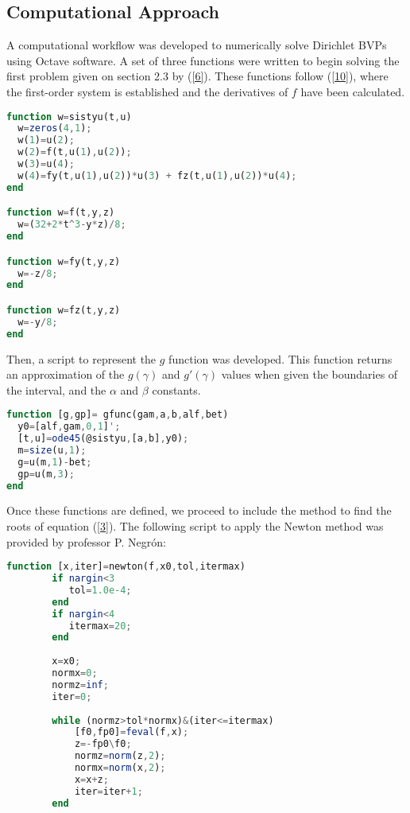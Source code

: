 \documentclass{article}
\begin{document}
\subsection{Computational Approach}

A computational workflow was developed to numerically solve Dirichlet BVPs using Octave software. A set of three functions were written to begin solving the first problem given on section 2.3 by (\ref{6}). These functions follow (\ref{10}), where the first-order system is established and the derivatives of $f$ have been calculated.  

\begin{lstlisting}[language=Octave]
function w=sistyu(t,u)
  w=zeros(4,1);
  w(1)=u(2);
  w(2)=f(t,u(1),u(2));
  w(3)=u(4);
  w(4)=fy(t,u(1),u(2))*u(3) + fz(t,u(1),u(2))*u(4);
end 

function w=f(t,y,z)
  w=(32+2*t^3-y*z)/8;
end

function w=fy(t,y,z)
  w=-z/8;
end

function w=fz(t,y,z)
  w=-y/8;
end
\end{lstlisting}

Then, a script to represent the $g$ function was developed. This function returns an approximation of the $g(\gamma)$ and $g'(\gamma)$ values when given the boundaries of the interval, and the $\alpha$ and $\beta$ constants. 

\begin{lstlisting}[language=Octave]
function [g,gp]= gfunc(gam,a,b,alf,bet)
  y0=[alf,gam,0,1]';
  [t,u]=ode45(@sistyu,[a,b],y0);
  m=size(u,1);
  g=u(m,1)-bet;
  gp=u(m,3);
end
\end{lstlisting}

\newpage 

Once these functions are defined, we proceed to include the method to find the roots of equation (\ref{3}). The following script to apply the Newton method was provided by professor P. Negr\'{o}n:

\begin{lstlisting}[language=Octave]
    function [x,iter]=newton(f,x0,tol,itermax)
        if nargin<3
           tol=1.0e-4;
        end
        if nargin<4
           itermax=20;
        end
        
        x=x0;
        normx=0;
        normz=inf;
        iter=0;
        
        while (normz>tol*normx)&(iter<=itermax)
            [f0,fp0]=feval(f,x);
            z=-fp0\f0;
            normz=norm(z,2);
            normx=norm(x,2);
            x=x+z;
            iter=iter+1;
        end
\end{lstlisting}
\end{document}
